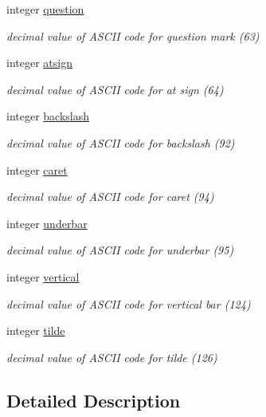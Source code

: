 \begin{DoxyCompactItemize}
integer \hyperlink{classascii_aec590b3fdb4d5c80d8cb2c8e2423f81a}{question}
\begin{DoxyCompactList}\small\item\em decimal value of A\-S\-C\-I\-I code for question mark (63) \end{DoxyCompactList}\item 
integer \hyperlink{classascii_a3d714a294231b6d9d86c8f74cd0fdf5f}{atsign}
\begin{DoxyCompactList}\small\item\em decimal value of A\-S\-C\-I\-I code for at sign (64) \end{DoxyCompactList}\item 
integer \hyperlink{classascii_ab2fa5d3e44c7149695edb42bef470b7b}{backslash}
\begin{DoxyCompactList}\small\item\em decimal value of A\-S\-C\-I\-I code for backslash (92) \end{DoxyCompactList}\item 
integer \hyperlink{classascii_a5dbe67952255c7a16e494e05547d7e3f}{caret}
\begin{DoxyCompactList}\small\item\em decimal value of A\-S\-C\-I\-I code for caret (94) \end{DoxyCompactList}\item 
integer \hyperlink{classascii_ac283ef49a83661efda871957fb88f00e}{underbar}
\begin{DoxyCompactList}\small\item\em decimal value of A\-S\-C\-I\-I code for underbar (95) \end{DoxyCompactList}\item 
integer \hyperlink{classascii_abe4af91532cec1903358ba9db8059a12}{vertical}
\begin{DoxyCompactList}\small\item\em decimal value of A\-S\-C\-I\-I code for vertical bar (124) \end{DoxyCompactList}\item 
integer \hyperlink{classascii_adc73c99718708c046c178951df471232}{tilde}
\begin{DoxyCompactList}\small\item\em decimal value of A\-S\-C\-I\-I code for tilde (126) \end{DoxyCompactList}\end{DoxyCompactItemize}


\subsection{Detailed Description}


